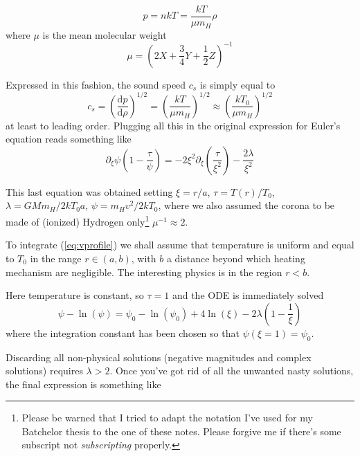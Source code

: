 \begin{equation*}
    p = nkT = \frac{kT}{\mu m_{H}}\rho
\end{equation*}
where $\mu$ is the mean molecular weight
\begin{equation*}
    \mu = \left(2X+\frac{3}{4}Y+\frac{1}{2}Z\right)^{-1}
\end{equation*}
\par Expressed in this fashion, the sound speed $c_{s}$ is simply equal to
\begin{equation}
    c_{s} = \left(\frac{\text{d}p}{\text{d}\rho}\right)^{1/2} = \left(\frac{kT}{\mu m_{H}}\right)^{1/2} \approx \left(\frac{kT_{0}}{\mu m_{H}}\right)^{1/2}
    \label{eq:sound_speed_ideal}
\end{equation}
at least to leading order. Plugging all this in the original expression for Euler's equation reads something like
\begin{equation}
    \partial_{\xi}\psi\left(1-\frac{\tau}{\psi}\right) = -2\xi^{2}\partial_{\xi}\left(\frac{\tau}{\xi^{2}}\right)-\frac{2\lambda}{\xi^{2}} 
    \label{eq:vprofile}
\end{equation}
\par This last equation was obtained setting $\xi = r/a$, $\tau = T(r)/T_{0}$, $\lambda = GMm_{H}/2kT_{0}a$, $\psi = m_{H}v^{2}/2kT_{0}$, where we also assumed the corona to be made of (ionized) Hydrogen only\footnote{Please be warned that I tried to adapt the notation I've used for my Batchelor thesis to the one of these notes. Please forgive me if there's some subscript not \emph{subscripting} properly.} $\mu^{-1}\approx 2$.
\par To integrate (\ref{eq:vprofile}) we shall assume that temperature is uniform and equal to $T_{0}$ in the range $r\in(a,b)$, with $b$ a distance beyond which heating mechanism are negligible. The interesting physics is in the region $r<b$.
\par Here temperature is constant, so $\tau = 1$ and the ODE is immediately solved
\begin{equation}
    \psi -\ln(\psi) = \psi_{0}-\ln(\psi_{0})+4\ln(\xi)-2\lambda\left(1-\frac{1}{\xi}\right)
    \label{eq:psi}
\end{equation}
where the integration constant has been chosen so that $\psi(\xi = 1) = \psi_{0}$.
\par Discarding all non-physical solutions (negative magnitudes and complex solutions) requires $\lambda > 2$. Once you've got rid of all the unwanted nasty solutions, the final expression is something like
